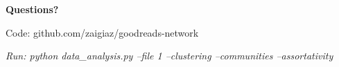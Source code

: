 \documentclass{beamer}
\begin{document}
  \begin{frame}
    \centering
    \fontsize{14}{16}\selectfont
    \textbf{Questions?}
    
    \vspace{1cm}
    \fontsize{12}{14}\selectfont
    Code: github.com/zaigiaz/goodreads-network
    
    \vspace{0.5cm}
    \textit{Run: python data\_analysis.py --file 1 --clustering --communities --assortativity}
  \end{frame}
\end{document}
